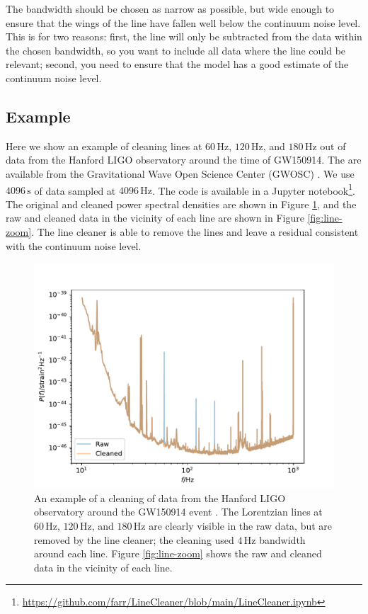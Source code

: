 \documentclass[modern]{aastex631}
\begin{document}
The bandwidth should be chosen as narrow as possible, but wide enough to ensure
that the wings of the line have fallen well below the continuum noise level.
This is for two reasons: first, the line will only be subtracted from the data
within the chosen bandwidth, so you want to include all data where the line
could be relevant; second, you need to ensure that the model has a good estimate
of the continuum noise level.

\subsection{Example}

Here we show an example of cleaning lines at $60 \, \mathrm{Hz}$, $120 \,
\mathrm{Hz}$, and $180 \, \mathrm{Hz}$ out of data from the Hanford LIGO
observatory around the time of GW150914.  The are available from the
Gravitational Wave Open Science Center (GWOSC)
\cite{GWOSC,GWOSC2,GW150914-GWOSC}.  We use $4096 \, \mathrm{s}$ of data sampled
at $4096 \, \mathrm{Hz}$.  The code is available in a Jupyter notebook\footnote{\url{https://github.com/farr/LineCleaner/blob/main/LineCleaner.ipynb}}.  The original and cleaned power spectral densities are shown in Figure \ref{fig:cleaned-psd}, and the raw and cleaned data in the vicinity of each line are shown in Figure \ref{fig:line-zoom}.  The line cleaner is able to remove the lines and leave a residual consistent with the continuum noise level.

\begin{figure}
    \includegraphics[width=\columnwidth]{raw-and-cleaned-psd.pdf}
    \caption{\label{fig:cleaned-psd} An example of a cleaning of data from the Hanford LIGO observatory around the GW150914 event \cite{Abbott2016,Abbott2019,GWOSC,GWOSC2,GW150914-GWOSC}.  The Lorentzian lines at $60 \, \mathrm{Hz}$, $120 \, \mathrm{Hz}$, and $180 \, \mathrm{Hz}$ are clearly visible in the raw data, but are removed by the line cleaner; the cleaning used $4 \, \mathrm{Hz}$ bandwidth around each line.  Figure \ref{fig:line-zoom} shows the raw and cleaned data in the vicinity of each line.}
\end{figure}
\end{document}
